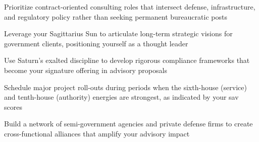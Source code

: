 \begin{diamondlist}
  \item {\fontsize{8.5}{12}\selectfont Prioritize contract-oriented consulting roles that intersect defense, infrastructure, and regulatory policy rather than seeking permanent bureaucratic posts}
  \item {\fontsize{8.5}{12}\selectfont Leverage your Sagittarius Sun to articulate long-term strategic visions for government clients, positioning yourself as a thought leader}
  \item {\fontsize{8.5}{12}\selectfont Use Saturn's exalted discipline to develop rigorous compliance frameworks that become your signature offering in advisory proposals}
  \item {\fontsize{8.5}{12}\selectfont Schedule major project roll-outs during periods when the sixth-house (service) and tenth-house (authority) energies are strongest, as indicated by your sav scores}
  \item {\fontsize{8.5}{12}\selectfont Build a network of semi-government agencies and private defense firms to create cross-functional alliances that amplify your advisory impact}
\end{diamondlist}



